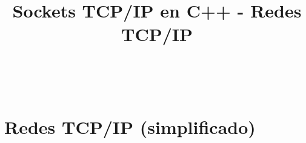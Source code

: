 

\title%
{Sockets TCP/IP en C++ - Redes TCP/IP}


\subject{Sockets TCP/IP en C++ - Redes TCP/IP}




\begin{frame}
   \titlepage
\end{frame}

~%
\section{Redes TCP/IP (simplificado)}


